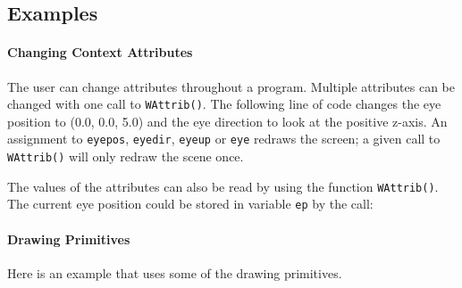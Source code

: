 \subsection{Examples}

\paragraph{Changing Context Attributes}
The user can change attributes throughout a program. Multiple
attributes can be changed with one call to \texttt{WAttrib()}.  The
following line of code changes the eye position to (0.0, 0.0, 5.0) and
the eye direction to look at the positive z-axis. An assignment to
\texttt{eyepos}, \texttt{eyedir}, \texttt{eyeup} or \texttt{eye}
redraws the screen; a given call to \texttt{WAttrib()} will only
redraw the scene once.


The values of the attributes can also be read by using the function
\texttt{WAttrib()}. The current eye position could be stored in variable
\texttt{ep} by the call:


\paragraph{Drawing Primitives}
Here is an example that uses some of the drawing primitives. 


